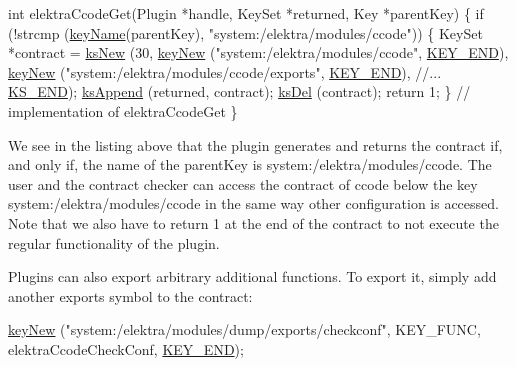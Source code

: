 \begin{DoxyCode}
\textcolor{keywordtype}{int} elektraCcodeGet(Plugin *handle, KeySet *returned, Key *parentKey)
\{
        \textcolor{keywordflow}{if} (!strcmp (\hyperlink{group__keyname_ga8e805c726a60da921d3736cda7813513}{keyName}(parentKey), \textcolor{stringliteral}{"system:/elektra/modules/ccode"}))
        \{
                KeySet *contract = \hyperlink{group__keyset_ga671e1aaee3ae9dc13b4834a4ddbd2c3c}{ksNew} (30,
                        \hyperlink{group__key_gad23c65b44bf48d773759e1f9a4d43b89}{keyNew} (\textcolor{stringliteral}{"system:/elektra/modules/ccode"},
                                \hyperlink{group__key_gga9b703ca49f48b482def322b77d3e6bc8aa8adb6fcb92dec58fb19410eacfdd403}{KEY\_END}),
                        \hyperlink{group__key_gad23c65b44bf48d773759e1f9a4d43b89}{keyNew} (\textcolor{stringliteral}{"system:/elektra/modules/ccode/exports"},
                                \hyperlink{group__key_gga9b703ca49f48b482def322b77d3e6bc8aa8adb6fcb92dec58fb19410eacfdd403}{KEY\_END}),
                        \textcolor{comment}{//...}
                        \hyperlink{group__keyset_ga7a28fce3773b2c873c94ac80b8b4cd54}{KS\_END});
                \hyperlink{group__keyset_ga21eb9c3a14a604ee3a8bdc779232e7b7}{ksAppend} (returned, contract);
                \hyperlink{group__keyset_ga27e5c16473b02a422238c8d970db7ac8}{ksDel} (contract);
                \textcolor{keywordflow}{return} 1;
        \}
        \textcolor{comment}{// implementation of elektraCcodeGet}
\}
\end{DoxyCode}


We see in the listing above that the plugin generates and returns the contract if, and only if, the name of the {\ttfamily parent\+Key} is {\ttfamily system\+:/elektra/modules/ccode}. The user and the contract checker can access the contract of ccode below the key {\ttfamily system\+:/elektra/modules/ccode} in the same way other configuration is accessed. Note that we also have to {\ttfamily return 1} at the end of the contract to not execute the regular functionality of the plugin.

Plugins can also export arbitrary additional functions. To export it, simply add another {\ttfamily exports} symbol to the contract\+:


\begin{DoxyCode}
\hyperlink{group__key_gad23c65b44bf48d773759e1f9a4d43b89}{keyNew} (\textcolor{stringliteral}{"system:/elektra/modules/dump/exports/checkconf"}, KEY\_FUNC,
        elektraCcodeCheckConf, \hyperlink{group__key_gga9b703ca49f48b482def322b77d3e6bc8aa8adb6fcb92dec58fb19410eacfdd403}{KEY\_END});
\end{DoxyCode}


